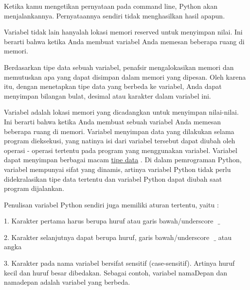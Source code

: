 \vspace{12pt}
\noindent 
Ketika kamu mengetikan pernyataan pada command line, Python akan menjalankannya. Pernyataannya sendiri tidak menghasilkan hasil apapun. \par
\vspace{12pt}
\noindent 
Variabel tidak lain hanyalah lokasi memori reserved untuk menyimpan nilai. $  $Ini berarti bahwa ketika Anda membuat variabel Anda memesan beberapa ruang di memori. \par
\vspace{12pt}
\noindent 
Berdasarkan tipe data sebuah variabel, penafsir mengalokasikan memori dan memutuskan apa yang dapat disimpan dalam memori yang dipesan. $  $Oleh karena itu, dengan menetapkan tipe data yang berbeda ke variabel, Anda dapat menyimpan bilangan bulat, desimal atau karakter dalam variabel ini. \par
\vspace{12pt}
\noindent 
Variabel adalah lokasi memori yang dicadangkan untuk menyimpan nilai-nilai. Ini berarti bahwa ketika Anda membuat sebuah variabel Anda memesan beberapa ruang di memori. Variabel menyimpan data yang dilakukan selama program dieksekusi, yang natinya isi dari variabel tersebut dapat diubah oleh operasi - operasi tertentu pada program yang menggunakan variabel.\vspace{\baselineskip}
\vspace{\baselineskip}
Variabel dapat menyimpan berbagai macam $  $\href{https://www.belajarpython.com/2015/05/tipe-data-python.html}{tipe data}
. Di dalam pemrograman Python, variabel mempunyai sifat yang dinamis, artinya variabel Python tidak perlu didekralasikan tipe data tertentu dan variabel Python dapat diubah saat program dijalankan. \par
\noindent 
\vspace{\baselineskip}
\vspace{\baselineskip}
Penulisan variabel Python sendiri juga memiliki aturan tertentu, yaitu : \par
\noindent 
\vspace{\baselineskip}
1. Karakter pertama harus berupa huruf atau garis bawah/underscore $  $ $  \_  $ \par
\noindent 
\vspace{\baselineskip}
2. Karakter selanjutnya dapat berupa huruf, garis bawah/underscore $  $ $  \_  $ $  $atau angka \par
\noindent 
\vspace{\baselineskip}
3. Karakter pada nama variabel bersifat sensitif (case-sensitif). Artinya huruf kecil dan huruf besar dibedakan. Sebagai contoh, variabel $  $namaDepan $  $dan $  $namadepan $  $adalah variabel yang berbeda.\vspace{\baselineskip}
